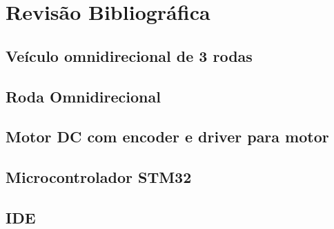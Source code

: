 
\chapter{Revisão Bibliográfica}


\section{Veículo omnidirecional de 3 rodas}


\section{Roda Omnidirecional}


\section{Motor DC com encoder e driver para motor}


\section{Microcontrolador STM32}


\section{IDE}



